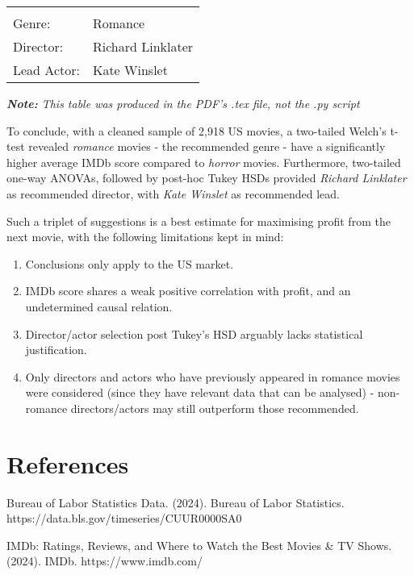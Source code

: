 \documentclass[11pt]{article}
\begin{document}
\begin{center}
\begin{tabular}{p{3cm}p{3cm}}
 & \\
Genre: & Romance \\
Director: & Richard Linklater \\
Lead Actor: & Kate Winslet \\

\end{tabular}
\begin{tablenotes}
    \centering
    \small
    \item
    \item \textit{\textbf{Note:} This table was produced in the PDF's .tex file, not the .py script}
\end{tablenotes}
\end{center}

To conclude, with a cleaned sample of 2,918 US movies, a two-tailed Welch's t-test revealed \textit{romance} movies - the recommended genre - have a significantly higher average IMDb score compared to \textit{horror} movies. Furthermore, two-tailed one-way ANOVAs, followed by post-hoc Tukey HSDs provided \textit{Richard Linklater} as recommended director, with \textit{Kate Winslet} as recommended lead. 

Such a triplet of suggestions is a best estimate for maximising profit from the next movie, with the following limitations kept in mind:

\begin{enumerate}
    \item Conclusions only apply to the US market.
    \item IMDb score shares a weak positive correlation with profit, and an undetermined causal relation.
    \item Director/actor selection post Tukey's HSD arguably lacks statistical justification.
    \item Only directors and actors who have previously appeared in romance movies were considered (since they have relevant data that can be analysed) - non-romance directors/actors may still outperform those recommended. 
\end{enumerate}

\pagebreak
\section{References}

Bureau of Labor Statistics Data. (2024). Bureau of Labor Statistics. https://data.bls.gov/timeseries/CUUR0000SA0

IMDb: Ratings, Reviews, and Where to Watch the Best Movies \& TV Shows. (2024). IMDb. https://www.imdb.com/
\end{document}
